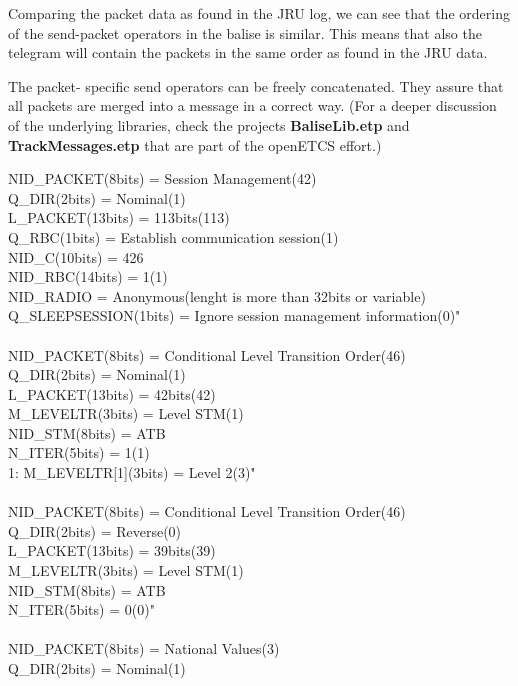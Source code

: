\documentclass{template/openetcs_article}
\begin{document}
Comparing the packet data as found in the JRU log, we can see that the ordering of the send-packet operators in the balise is similar. This means that also the telegram will contain the packets in the same order as found in the JRU data.

The packet- specific send operators can be freely concatenated. They assure that all packets are merged into a message in a correct way. (For a deeper discussion of the underlying libraries, check the projects \textbf{BaliseLib.etp} and \textbf{TrackMessages.etp} that are part of the openETCS effort.)

\begin{table}[H]
  \footnotesize\sffamily
NID\_PACKET(8bits) = Session Management(42) \\
Q\_DIR(2bits) = Nominal(1) \\
L\_PACKET(13bits) = 113bits(113) \\
Q\_RBC(1bits) = Establish communication session(1) \\
NID\_C(10bits) = 426 \\
NID\_RBC(14bits) = 1(1) \\
    NID\_RADIO = Anonymous(lenght is more than 32bits or variable) \\
Q\_SLEEPSESSION(1bits) = Ignore session management information(0)" \\
\\
NID\_PACKET(8bits) = Conditional Level Transition Order(46) \\
Q\_DIR(2bits) = Nominal(1) \\
L\_PACKET(13bits) = 42bits(42) \\
M\_LEVELTR(3bits) = Level STM(1) \\
    NID\_STM(8bits) = ATB \\
N\_ITER(5bits) = 1(1) \\
    1: M\_LEVELTR[1](3bits) = Level 2(3)" \\
    \\
NID\_PACKET(8bits) = Conditional Level Transition Order(46) \\
Q\_DIR(2bits) = Reverse(0) \\
L\_PACKET(13bits) = 39bits(39) \\
M\_LEVELTR(3bits) = Level STM(1) \\
    NID\_STM(8bits) = ATB \\
N\_ITER(5bits) = 0(0)" \\
\\
NID\_PACKET(8bits) = National Values(3) \\
Q\_DIR(2bits) = Nominal(1) \\

\end{table}
\end{document}
